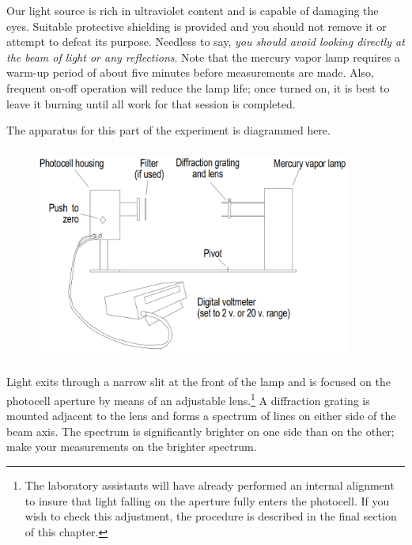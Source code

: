 Our light source is rich in ultraviolet content and is capable of
damaging the eyes. Suitable protective shielding is provided and you
should not remove it or attempt to defeat its purpose. Needless to say,
\emph{you should avoid looking directly at the beam of light or any
reflections}. Note that the mercury vapor lamp requires a warm-up period
of about five minutes before measurements are made. Also, frequent
on-off operation will reduce the lamp life; once turned on, it is best
to leave it burning until all work for that session is completed.

The apparatus for this part of the experiment is diagrammed here.
\begin{figure}[h]
\centering
  \includegraphics[width=4.08333in,height=2.77083in]{images/06_einstein/003.png}
\end{figure}


Light exits through a narrow slit at the front of the lamp and is focused on
the photocell aperture by means of an adjustable lens.\footnote{The
  laboratory assistants will have already performed an internal
  alignment to insure that light falling on the aperture fully enters
  the photocell. If you wish to check this adjustment, the procedure is
  described in the final section of this chapter.} A diffraction grating is mounted adjacent to
the lens and forms a spectrum of lines on either side of the beam axis.
The spectrum is significantly brighter on one side than on the other;
make your measurements on the brighter spectrum.


